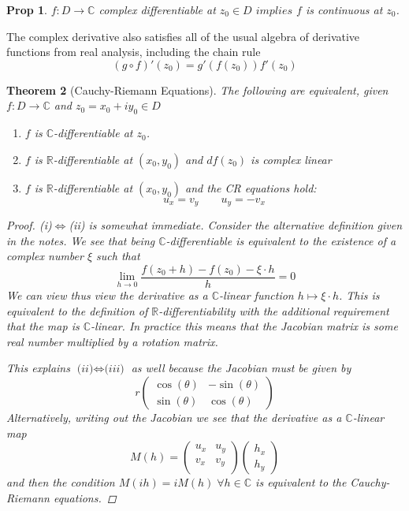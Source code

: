 \documentclass[11pt]{article}
\newcommand{\R}{\mathbb{R}}
\newcommand{\C}{\mathbb{C}}
\newtheorem{theorem}{Theorem}[section]
\newtheorem{prop}[theorem]{Prop}
\begin{document}
\begin{prop}
$f:D\to\C$ complex differentiable at $z_0\in D$ $implies$ $f$ is continuous at $z_0$.
\end{prop}

The complex derivative also satisfies all of the usual algebra of derivative functions from real analysis, including the chain rule
\[
	(g\circ f)'(z_0) = g'(f(z_0))f'(z_0)
\]

\begin{theorem}[Cauchy-Riemann Equations]
The following are equivalent, given $f:D\to\C$ and $z_0=x_0 + i y_0\in D$
\begin{enumerate}[label=(\alph*)]
	\item $f$ is $\C$-differentiable at $z_0$.
	\item $f$ is $\R$-differentiable at $(x_0,y_0)$ and $df(z_0)$ is complex linear
	\item $f$ is $\R$-differentiable at $(x_0,y_0)$ and the CR equations hold:
		\[
			u_x=v_y \quad\quad u_y = -v_x
		\]
\end{enumerate}

\begin{proof}
\textit{(i)}$\iff$\textit{(ii)} is somewhat immediate.
Consider the alternative definition given in the notes.
We see that being $\C$-differentiable is equivalent to the existence of a complex number $\xi$ such that
\[
	\lim_{h\to 0}\frac{f(z_0+h)-f(z_0)-\xi\cdot h}{h}=0
\]
We can view thus view the derivative as a $\C$-linear function $h\mapsto \xi\cdot h$.
This is equivalent to the definition of $\R$-differentiability with the additional requirement that the map is $\C$-linear.
In practice this means that the Jacobian matrix is some real number multiplied by a rotation matrix.

This explains $\textit{(ii)}\iff\textit{(iii)}$ as well because the Jacobian must be given by
\[
	r
	\begin{pmatrix}
		\cos(\theta) & -\sin(\theta)	\\
		\sin(\theta) & \cos(\theta)
	\end{pmatrix}
\]
Alternatively, writing out the Jacobian we see that the derivative as a $\C$-linear map
\[
	M(h)=
\begin{pmatrix}
	u_x & u_y \\
	v_x & v_y \\
\end{pmatrix}
	\begin{pmatrix}
	h_x \\
	h_y
	\end{pmatrix}
\]
and then the condition $M(ih)=iM(h)\; \forall h\in \C$ is equivalent to the Cauchy-Riemann equations.
\end{proof}
\end{theorem}
\end{document}
